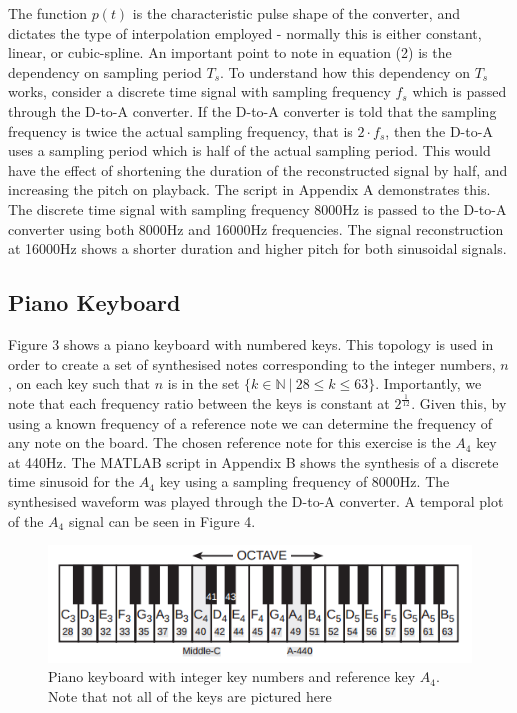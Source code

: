 \documentclass{article}
\begin{document}
 The function $p(t)$ is the characteristic pulse shape of the converter, and dictates the type of interpolation employed - normally this is either constant, linear, or cubic-spline. An important point to note in equation (2) is the dependency on sampling period $T_s$. To understand how this dependency on $T_s$ works, consider a discrete time signal with sampling frequency $f_s$ which is passed through the D-to-A converter. If the D-to-A converter is told that the sampling frequency is twice the actual sampling frequency, that is $2 \cdot f_s$, then the D-to-A uses a sampling period which is half of the actual sampling period. This would have the effect of shortening the duration of the reconstructed signal by half, and increasing the pitch on playback. The script in Appendix A demonstrates this. The discrete time signal with sampling frequency 8000$\si{\hertz}$ is passed to the D-to-A converter using both 8000$\si{\hertz}$ and 16000$\si{\hertz}$ frequencies. The signal reconstruction at 16000$\si{\hertz}$ shows a shorter duration and higher pitch for both sinusoidal signals.
 
 \newpage
 
\subsection{Piano Keyboard}
Figure 3 shows a piano keyboard with numbered keys. This topology is used in order to create a set of synthesised notes corresponding to the integer numbers, $n$, on each key such that $n$ is in the set $\{k \in \mathbb{N} \ | \ 28 \leq k \leq 63 \}$. Importantly, we note that each frequency ratio between the keys is constant at $2^{\frac{1}{12}}$. Given this, by using a known frequency of a reference note we can determine the frequency of any note on the board. The chosen reference note for this exercise is the $A_4$ key at 440$\si{\hertz}$. The MATLAB script in Appendix B shows the synthesis of a discrete time sinusoid for the $A_4$ key using a sampling frequency of 8000$\si{\hertz}$. The synthesised waveform was played through the D-to-A converter. A temporal plot of the $A_4$ signal can be seen in Figure 4.

\begin{figure}[H]
	\centering
	\includegraphics[scale=0.5]{piano.png}
	\caption{Piano keyboard with integer key numbers and reference key $A_4$. Note that not all of the keys are pictured here}
\end{figure}
\end{document}

